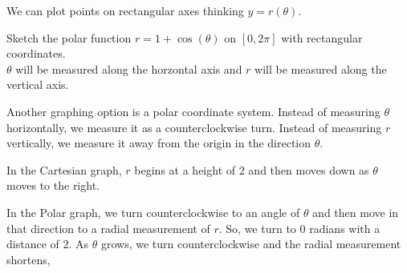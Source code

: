 \documentclass{ximera}
\begin{document}
We can plot points on rectangular axes thinking $y = r(\theta)$. 





\begin{example}
  Sketch the polar function $r=1+\cos(\theta)$ on $[0,2\pi]$ with rectangular coordinates.  \\


  $\theta$ will be measured along the horzontal axis and $r$ will be measured along the vertical axis.

    \begin{image}%
      \end{image}
\end{example}


Another graphing option is a polar coordinate system.  Instead of measuring $\theta$ horizontally, we measure it as a counterclockwise turn.  Instead of measuring $r$ vertically, we measure it away from the origin in the direction $\theta$.

In the Cartesian graph, $r$ begins at a height of $2$ and then moves down as $\theta$ moves to the right.

In the Polar graph, we turn counterclockwise to an angle of $\theta$ and then move in that direction to a radial measurement of $r$. So, we turn to $0$ radians with a distance of $2$.  As $\theta$ grows, we turn counterclockwise and the radial measurement shortens,

\begin{image}
\end{image}
\end{document}
